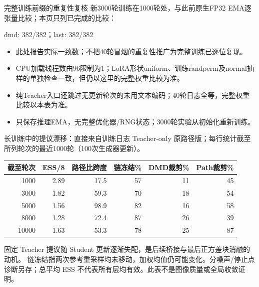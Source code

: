 \documentclass[10pt,aspectratio=169]{beamer}
\begin{document}
\begin{frame}{完整训练前缀的重复性复核}
\small
新3000轮训练在1000轮处，与此前原生FP32 EMA逐张量比较；本页只列已完成的比较：\par
dmd: 382/382；last: 382/382
\begin{itemize}\itemsep5pt
\item 此处报告实际一致数；不把40轮冒烟的重复性推广为完整训练已逐位复现。
\item CPU加载线程数由96限制为1；LoRA形状uniform、训练randperm及normal抽样的单独检查一致，但仍以这里的完整权重比较为准。
\item 纯Teacher入口还跳过无更新轮次的未用文本编码；40轮日志全等，完整权重比较以本表为准。
\item 只保存推理EMA，无完整优化器/RNG状态；3000轮实验从初始化重新训练。
\end{itemize}
\end{frame}
\begin{frame}{长训练中的提议漂移：直接来自训练日志}
\scriptsize\centering
Teacher-only 原路径版；每行统计截至所列轮次的最近1000轮（100次生成器更新）。
\begin{tabular}{rrrrrr}\toprule
截至轮次 & ESS/8 & 路径比跨度 & 链冻结\% & DMD裁剪\% & Path裁剪\%\\\midrule
1000 & 2.89 & 17.5 & 57 & 11 & 45 \\
3000 & 1.82 & 59.3 & 70 & 18 & 54 \\
5000 & 1.56 & 98.9 & 82 & 16 & 58 \\
8000 & 1.28 & 72.4 & 87 & 26 & 39 \\
10000 & 1.63 & 53.3 & 78 & 25 & 87 \\
\bottomrule\end{tabular}\par\raggedright\vspace{6pt}
固定 Teacher 提议随 Student 更新逐渐失配，是后续桥接与最后正方差块消融的动机。
链冻结指两次参考重采样均未移动，加权均值仍可能变化。分噪声/停止点诊断另存；总平均 ESS 不代表所有层均有效。此表不是图像质量或全局收敛证明。
\end{frame}
\end{document}
